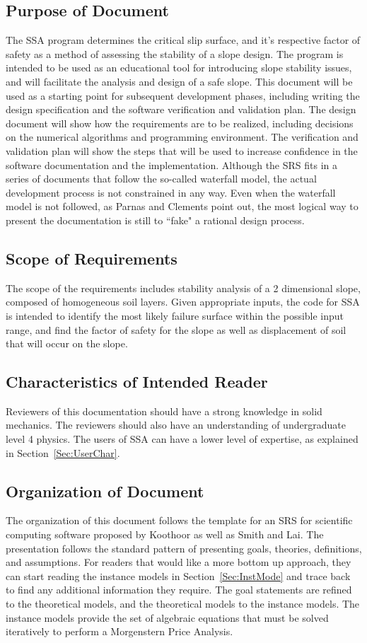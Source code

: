 \documentclass[12pt]{article}
\begin{document}
\subsection{Purpose of Document}
\label{Sec:PurpofDocu}
The SSA program determines the critical slip surface, and it's respective factor of safety as a method of assessing the stability of a slope design. The program is intended to be used as an educational tool for introducing slope stability issues, and will facilitate the analysis and design of a safe slope.
This document will be used as a starting point for subsequent development phases, including writing the design specification and the software verification and validation plan. The design document will show how the requirements are to be realized, including decisions on the numerical algorithms and programming environment. The verification and validation plan will show the steps that will be used to increase confidence in the software documentation and the implementation. Although the SRS fits in a series of documents that follow the so-called waterfall model, the actual development process is not constrained in any way. Even when the waterfall model is not followed, as Parnas and Clements point out, the most logical way to present the documentation is still to ``fake" a rational design process.
\subsection{Scope of Requirements}
\label{Sec:ScopofRequ}
The scope of the requirements includes stability analysis of a 2 dimensional slope, composed of homogeneous soil layers. Given appropriate inputs, the code for SSA is intended to identify the most likely failure surface within the possible input range, and find the factor of safety for the slope as well as displacement of soil that will occur on the slope.
\subsection{Characteristics of Intended Reader}
\label{Sec:CharofInteRead}
Reviewers of this documentation should have a strong knowledge in solid mechanics. The reviewers should also have an understanding of undergraduate level 4 physics. The users of SSA can have a lower level of expertise, as explained in Section~\ref{Sec:UserChar}.
\subsection{Organization of Document}
\label{Sec:OrgaofDocu}
The organization of this document follows the template for an SRS for scientific computing software proposed by Koothoor as well as Smith and Lai. The presentation follows the standard pattern of presenting goals, theories, definitions, and assumptions. For readers that would like a more bottom up approach, they can start reading the instance models in Section~\ref{Sec:InstMode} and trace back to find any additional information they require.
The goal statements are refined to the theoretical models, and the theoretical models to the instance models. The instance models provide the set of algebraic equations that must be solved iteratively to perform a Morgenstern Price Analysis.
\end{document}
